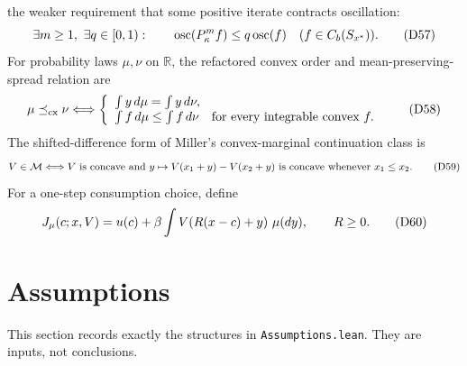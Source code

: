 \documentclass[11pt]{article}
\newcommand{\R}{\mathbb R}
\newcommand{\eqD}[1]{\refstepcounter{equation}\tag{D#1}}
\begin{document}
the weaker requirement that some positive iterate contracts oscillation:
\begin{equation}
 \exists m\ge1,\ \exists q\in[0,1):\qquad
 \operatorname{osc}(P_\kappa^m f)\le q\operatorname{osc}(f)
 \quad(f\in C_b(S_{x^*})).
 \eqD{57}\label{D57}
\end{equation}
For probability laws $\mu,\nu$ on $\R$, the refactored convex order and
mean-preserving-spread relation are
\begin{equation}
 \mu\preceq_{\rm cx}\nu
 \Longleftrightarrow
 \left\{\begin{array}{l}
 \int y\,d\mu=\int y\,d\nu,\\
 \int f\,d\mu\le\int f\,d\nu
 \quad\text{for every integrable convex }f.
 \end{array}\right.
 \eqD{58}\label{D58}
\end{equation}
The shifted-difference form of Miller's convex-marginal continuation class is
\begin{equation}
 V\in\mathcal M
 \Longleftrightarrow
 V\text{ is concave and }
 y\mapsto V(x_1+y)-V(x_2+y)\text{ is concave whenever }x_1\le x_2.
 \eqD{59}\label{D59}
\end{equation}
For a one-step consumption choice, define
\begin{equation}
 J_\mu(c;x,V)=u(c)+\beta\int
 V\!\left(R(x-c)+y\right)\,\mu(dy),\qquad R\ge0.
 \eqD{60}\label{D60}
\end{equation}

\section{Assumptions}

This section records exactly the structures in \texttt{Assumptions.lean}.
They are inputs, not conclusions.
\end{document}
